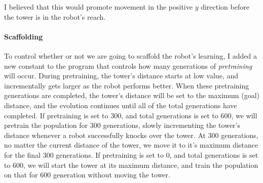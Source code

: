 \documentclass[12pt, a4paper]{article}
\begin{document}
\noindent I believed that this would promote movement in the positive $y$ direction before the tower is in the robot's reach.

\paragraph{Scaffolding} To control whether or not we are going to scaffold the robot's learning, I added a new constant to the program that controls how many generations of \emph{pretraining} will occur. During pretraining, the tower's distance starts at low value, and incrementally gets larger as the robot performs better. When these pretraining generations are completed, the tower's distance will be set to the maximum (goal) distance, and the evolution continues until all of the total generations have completed. If pretraining is set to 300, and total generations is set to 600, we will pretrain the population for 300 generations, slowly incrementing the tower's distance whenever a robot successfully knocks over the tower. At 300 generations, no matter the current distance of the tower, we move it to it's maximum distance for the final 300 generations. If pretraining is set to 0, and total generations is set to 600, we will start the tower at its maximum distance, and train the population on that for 600 generation without moving the tower.
\newpage
\end{document}
